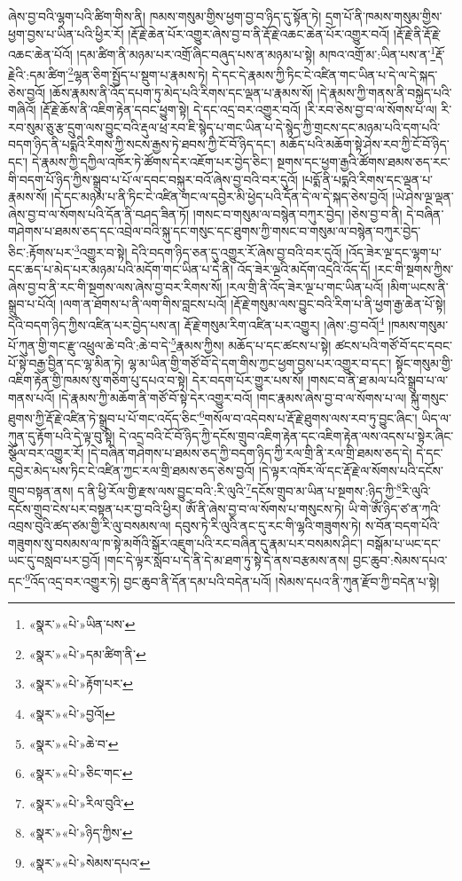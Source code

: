 ཞེས་བྱ་བའི་ལྷག་པའི་ཚིག་གིས་ནི། ཁམས་གསུམ་གྱིས་ཕྱག་བྱ་བ་ཉིད་དུ་སྟོན་ཏེ། དྲག་པོ་ནི་ཁམས་གསུམ་གྱིས་ཕྱག་བྱས་པ་ཡིན་པའི་ཕྱིར་རོ། །རྡོ་རྗེ་ཆེན་པོར་འགྱུར་ཞེས་བྱ་བ་ནི་རྡོ་རྗེ་འཆང་ཆེན་པོར་འགྱུར་བའོ། །རྡོ་རྗེ་ནི་རྡོ་རྗེ་འཆང་ཆེན་པོའོ། །དམ་ཚིག་ནི་མཉམ་པར་འགྲོ་ཞིང་བཞུད་པས་ན་མཉམ་པ་སྟེ། མཁའ་འགྲོ་མ་:ཡིན་པས་ན་\footnote{«སྣར་»«པེ་»ཡིན་པས་}རྡོ་རྗེའི་:དམ་ཚིག་\footnote{«སྣར་»«པེ་»དམ་ཚིག་ནི་}ལྷན་ཅིག་སྤྱོད་པ་སྡུག་པ་རྣམས་ཏེ། དེ་དང་དེ་རྣམས་ཀྱི་ཏིང་ངེ་འཛིན་གང་ཡིན་པ་དེ་ལ་དེ་སྐད་ཅེས་བྱའོ། །ཆོས་རྣམས་ནི་འོད་དཔག་ཏུ་མེད་པའི་རིགས་དང་ལྡན་པ་རྣམས་སོ། །དེ་རྣམས་ཀྱི་གནས་ནི་བསྐྱེད་པའི་གཞིའོ། །རྡོ་རྗེ་ཆོས་ནི་འཇིག་རྟེན་དབང་ཕྱུག་སྟེ། དེ་དང་འདྲ་བར་འགྱུར་བའོ། །རི་རབ་ཅེས་བྱ་བ་ལ་སོགས་པ་ལ། རི་རབ་སུམ་ཅུ་རྩ་དྲུག་ལས་བྱུང་བའི་རྡུལ་ཕྲ་རབ་ཇི་སྙེད་པ་གང་ཡིན་པ་དེ་སྙེད་ཀྱི་གྲངས་དང་མཉམ་པའི་དག་པའི་བདག་ཉིད་ནི་པདྨའི་རིགས་ཀྱི་སངས་རྒྱས་ཏེ་ཐབས་ཀྱི་ངོ་བོ་ཉིད་དང་། མཆོད་པའི་མཆོག་སྟེ་ཤེས་རབ་ཀྱི་ངོ་བོ་ཉིད་དང་། དེ་རྣམས་ཀྱི་དཀྱིལ་འཁོར་ཏེ་ཚོགས་དེར་འཇོག་པར་བྱེད་ཅིང་། སྔགས་དང་ཕྱག་རྒྱའི་ཚོགས་ཐམས་ཅད་རང་གི་བདག་པོ་ཉིད་ཀྱིས་སྒྲུབ་པ་པོ་ལ་དབང་བསྐུར་བའོ་ཞེས་བྱ་བའི་བར་དུའོ། །པདྨོ་ནི་པདྨའི་རིགས་དང་ལྡན་པ་རྣམས་སོ། །དེ་དང་མཉམ་པ་ནི་ཏིང་ངེ་འཛིན་གང་ལ་དབྱེར་མི་ཕྱེད་པའི་དོན་དེ་ལ་དེ་སྐད་ཅེས་བྱའོ། །ཡེ་ཤེས་ལྔ་ལྡན་ཞེས་བྱ་བ་ལ་སོགས་པའི་དོན་ནི་བཤད་ཟིན་ཏོ། །གསང་བ་གསུམ་ལ་བསྙེན་བཀུར་བྱེད། །ཅེས་བྱ་བ་ནི། དེ་བཞིན་གཤེགས་པ་ཐམས་ཅད་དང་འབྲེལ་བའི་སྐུ་དང་གསུང་དང་ཐུགས་ཀྱི་གསང་བ་གསུམ་ལ་བསྙེན་བཀུར་བྱེད་ཅིང་:རྟོགས་པར་\footnote{«སྣར་»«པེ་»རྟོག་པར་}འགྱུར་བ་སྟེ། དེའི་བདག་ཉིད་ཅན་དུ་འགྱུར་རོ་ཞེས་བྱ་བའི་བར་དུའོ། །འོད་ཟེར་ལྔ་དང་ལྷག་པ་དང་ཆད་པ་མེད་པར་མཉམ་པའི་མདོག་གང་ཡིན་པ་དེ་ནི། འོད་ཟེར་ལྔའི་མདོག་འདྲའི་འོད་དོ། །རང་གི་སྔགས་ཀྱིས་ཞེས་བྱ་བ་ནི་རང་གི་སྔགས་ལས་ཞེས་བྱ་བར་རིགས་སོ། །རལ་གྲི་ནི་འོད་ཟེར་ལྔ་པ་གང་ཡིན་པའོ། །མིག་ཡངས་ནི་སྒྲུབ་པ་པོའོ། །ལག་ན་ཐོགས་པ་ནི་ལག་གིས་བླངས་པའོ། །རྡོ་རྗེ་གསུམ་ལས་བྱུང་བའི་རིག་པ་ནི་ཕྱག་རྒྱ་ཆེན་པོ་སྟེ། དེའི་བདག་ཉིད་ཀྱིས་འཛིན་པར་བྱེད་པས་ན། རྡོ་རྗེ་གསུམ་རིག་འཛིན་པར་འགྱུར། །ཞེས་:བྱ་བའོ།\footnote{«སྣར་»«པེ་»བྱའོ།} །ཁམས་གསུམ་པོ་ཀུན་གྱི་གང་རྫུ་འཕྲུལ་ཆེ་བའི་:ཆེ་བ་དེ་\footnote{«སྣར་»«པེ་»ཆེ་བ་}རྣམས་ཀྱིས། མཆོད་པ་དང་ཚངས་པ་སྟེ། ཚངས་པའི་གཙོ་བོ་དང་དབང་པོ་སྟེ་བརྒྱ་བྱིན་དང་ལྷ་མིན་ཏེ། ལྷ་མ་ཡིན་གྱི་གཙོ་བོ་དེ་དག་གིས་ཀྱང་ཕྱག་བྱས་པར་འགྱུར་བ་དང་། སྟོང་གསུམ་གྱི་འཇིག་རྟེན་གྱི་ཁམས་སུ་གཅིག་པུ་དཔའ་བ་སྟེ། དེར་བདག་པོར་གྱུར་པས་སོ། །གསང་བ་ནི་ཐ་མལ་པའི་སྒྲུབ་པ་ལ་གནས་པའོ། །དེ་རྣམས་ཀྱི་མཆོག་ནི་གཙོ་བོ་སྟེ་དེར་འགྱུར་བའོ། །གང་རྣམས་ཞེས་བྱ་བ་ལ་སོགས་པ་ལ། སྐུ་གསུང་ཐུགས་ཀྱི་རྡོ་རྗེ་འཛིན་ཏེ་སྒྲུབ་པ་པོ་གང་འདོད་ཅིང་\footnote{«སྣར་»«པེ་»ཅིང་གང་}གསོལ་བ་འདེབས་པ་རྡོ་རྗེ་ཐུགས་ལས་རབ་ཏུ་བྱུང་ཞིང་། ཡིད་ལ་ཀུན་དུ་རྟོག་པའི་དེ་ལྟ་བུ་སྟེ། དེ་འདྲ་བའི་ངོ་བོ་ཉིད་ཀྱི་དངོས་གྲུབ་འཇིག་རྟེན་དང་འཇིག་རྟེན་ལས་འདས་པ་སྟེར་ཞིང་སྩོལ་བར་འགྱུར་རོ། །དེ་བཞིན་གཤེགས་པ་ཐམས་ཅད་ཀྱི་བདག་ཉིད་ཀྱི་རལ་གྲི་ནི་རལ་གྲི་ཐམས་ཅད་དེ། དེ་དང་དབྱེར་མེད་པས་ཏིང་ངེ་འཛིན་ཀྱང་རལ་གྲི་ཐམས་ཅད་ཅེས་བྱའོ། །དེ་ལྟར་འཁོར་ལོ་དང་རྡོ་རྗེ་ལ་སོགས་པའི་དངོས་གྲུབ་བསྟན་ནས། ད་ནི་ཕྱི་རོལ་གྱི་རྫས་ལས་བྱུང་བའི་:རི་ལུའི་\footnote{«སྣར་»«པེ་»རིལ་བུའི་}དངོས་གྲུབ་མ་ཡིན་པ་སྔགས་:ཉིད་ཀྱི་\footnote{«སྣར་»«པེ་»ཉིད་ཀྱིས་}རི་ལུའི་དངོས་གྲུབ་ངེས་པར་བསྟན་པར་བྱ་བའི་ཕྱིར། ཨོཾ་ནི་ཞེས་བྱ་བ་ལ་སོགས་པ་གསུངས་ཏེ། ཡི་གེ་ཨོཾ་ཉིད་ཙ་ན་ཀའི་འབྲས་བུའི་ཚད་ཙམ་གྱི་རི་ལུ་བསམས་ལ། དབུས་ཏེ་རི་ལུའི་ནང་དུ་རང་གི་ལྷའི་གཟུགས་ཏེ། ས་བོན་བདག་པོའི་གཟུགས་སུ་བསམས་ལ་ཁ་སྟེ་མགོའི་སྒོར་འཇུག་པའི་རང་བཞིན་དུ་རྣམ་པར་བསམས་ཤིང་། བསྒོམ་པ་ཡང་དང་ཡང་དུ་བསླབ་པར་བྱའོ། །གང་དེ་ལྟར་སློབ་པ་དེ་ནི་དེ་མ་ཐག་ཏུ་སྟེ་དེ་ནས་བརྩམས་ནས། བྱང་ཆུབ་:སེམས་དཔའ་དང་\footnote{«སྣར་»«པེ་»སེམས་དཔའ་}འོད་འདྲ་བར་འགྱུར་ཏེ། བྱང་ཆུབ་ནི་དོན་དམ་པའི་བདེན་པའོ། །སེམས་དཔའ་ནི་ཀུན་རྫོབ་ཀྱི་བདེན་པ་སྟེ། 